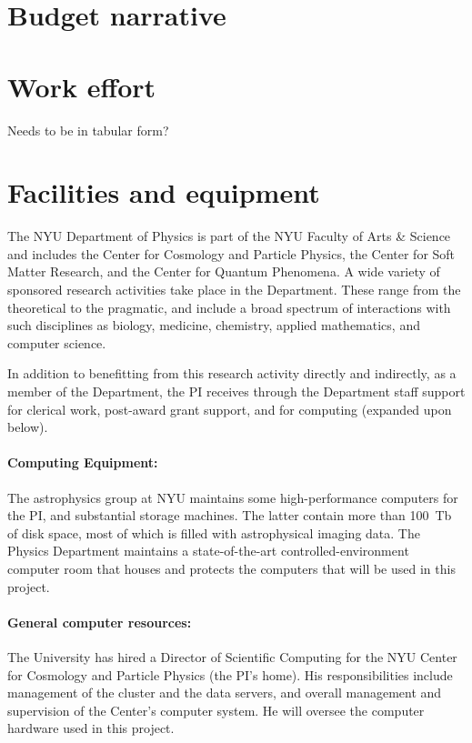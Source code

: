 \documentclass[12pt]{article}
\begin{document}
\clearpage
\section{Budget narrative}

\clearpage
\section{Work effort}

Needs to be in tabular form?

\clearpage
\section{Facilities and equipment}

The NYU Department of Physics is part of the NYU Faculty of Arts \&
Science and includes the Center for Cosmology and Particle Physics,
the Center for Soft Matter Research, and the Center for Quantum Phenomena.
A wide variety of sponsored
research activities take place in the Department.  These range from
the theoretical to the pragmatic, and include a broad spectrum of
interactions with such disciplines as biology, medicine, chemistry,
applied mathematics, and computer science.

In addition to benefitting from this research activity directly and
indirectly, as a member of the Department, the PI receives through the
Department staff support for clerical work, post-award grant support,
and for computing (expanded upon below).

\paragraph{Computing Equipment:}
The astrophysics group at NYU maintains some high-performance computers
for the PI, and substantial storage machines.
The latter contain more than 100~Tb of disk space, most of which is filled
with astrophysical imaging data.  The Physics Department maintains a
state-of-the-art controlled-environment computer room that houses and
protects the computers that will be used in this project.

\paragraph{General computer resources:}
The University has hired a Director of Scientific Computing for the
NYU Center for Cosmology and Particle Physics (the PI's home).  His
responsibilities include management of the cluster and the data
servers, and overall management and supervision of the Center's
computer system.  He will oversee the computer hardware used in this
project.
\end{document}
